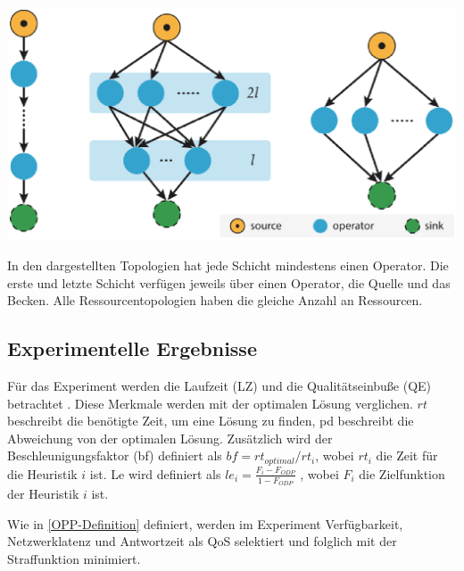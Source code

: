 \documentclass{article}
\begin{document}
\noindent
\begin{minipage}{0.5\textwidth}
    \includegraphics[width=0.9\linewidth]{res/topologies.eps}
\label{topologies}
\end{minipage}
\hspace{10pt}
\begin{minipage}{0.45\textwidth}
    In den dargestellten Topologien hat jede Schicht mindestens einen Operator. 
    Die erste und letzte Schicht verfügen jeweils über einen Operator, die Quelle und das Becken. 
    Alle Ressourcentopologien haben die gleiche Anzahl an Ressourcen.
\end{minipage}



\subsection{Experimentelle Ergebnisse}

Für das Experiment werden die Laufzeit (LZ) und die Qualitätseinbuße (QE) betrachtet \cite{efficient-operator-placement}.
Diese Merkmale werden mit der optimalen Lösung verglichen. $rt$ beschreibt die benötigte Zeit, 
um eine Lösung zu finden, pd beschreibt die Abweichung von der optimalen Lösung. 
Zusätzlich wird der Beschleunigungsfaktor (bf) definiert als $bf = rt_{optimal} / rt_i$, wobei $rt_i$ die Zeit für die Heuristik $i$ ist.
Le wird definiert als $le_i = \frac{F_i - F_{ODP}}{1 - F_{ODP}}$ \cite{efficient-operator-placement}, 
wobei $F_i$ die Zielfunktion der Heuristik $i$ ist.

Wie in \ref{OPP-Definition} definiert, werden im Experiment Verfügbarkeit, 
Netzwerklatenz und Antwortzeit als QoS selektiert und folglich mit der Straffunktion minimiert. 
\end{document}
